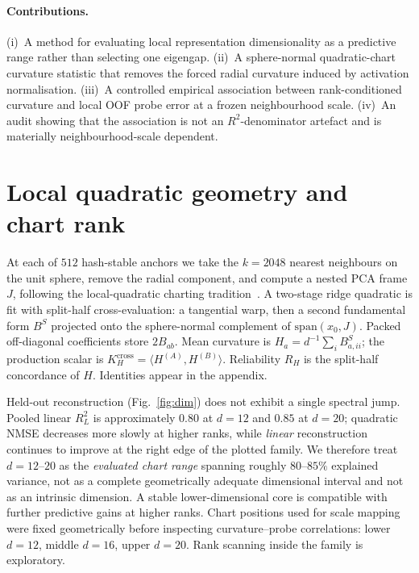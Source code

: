 \documentclass[mlabstract]{jmlr}
\begin{document}
\paragraph{Contributions.}
(i)~A method for evaluating local representation dimensionality as a predictive range rather than selecting one eigengap.
(ii)~A sphere-normal quadratic-chart curvature statistic that removes the forced radial curvature induced by activation normalisation.
(iii)~A controlled empirical association between rank-conditioned curvature and local OOF probe error at a frozen neighbourhood scale.
(iv)~An audit showing that the association is not an $R^{2}$-denominator artefact and is materially neighbourhood-scale dependent.

\section{Local quadratic geometry and chart rank}
\label{sec:geom}

At each of $512$ hash-stable anchors we take the $k{=}2048$ nearest neighbours on the unit sphere, remove the radial component, and compute a nested PCA frame $J$, following the local-quadratic charting tradition~\citep{donoho2003hessian}. A two-stage ridge quadratic is fit with split-half cross-evaluation: a tangential warp, then a second fundamental form $B^{S}$ projected onto the sphere-normal complement of $\mathrm{span}(x_{0},J)$. Packed off-diagonal coefficients store $2B_{ab}$. Mean curvature is $H_{a}=d^{-1}\sum_{i}B^{S}_{a,ii}$; the production scalar is $K_{H}^{\mathrm{cross}}=\langle H^{(A)},H^{(B)}\rangle$. Reliability $R_{H}$ is the split-half concordance of $H$. Identities appear in the appendix.

Held-out reconstruction (Fig.~\ref{fig:dim}) does not exhibit a single spectral jump. Pooled linear $R^{2}_{L}$ is approximately $0.80$ at $d{=}12$ and $0.85$ at $d{=}20$; quadratic NMSE decreases more slowly at higher ranks, while \emph{linear} reconstruction continues to improve at the right edge of the plotted family. We therefore treat $d{=}12$--$20$ as the \emph{evaluated chart range} spanning roughly $80$--$85\%$ explained variance, not as a complete geometrically adequate dimensional interval and not as an intrinsic dimension. A stable lower-dimensional core is compatible with further predictive gains at higher ranks. Chart positions used for scale mapping were fixed geometrically before inspecting curvature--probe correlations: lower $d{=}12$, middle $d{=}16$, upper $d{=}20$. Rank scanning inside the family is exploratory.
\end{document}
